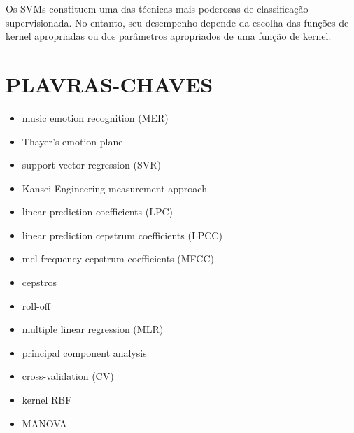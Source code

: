 \documentclass{article}
\begin{document}
Os SVMs constituem uma das técnicas mais poderosas de classificação supervisionada. No entanto, seu desempenho depende da escolha das funções de kernel apropriadas ou dos parâmetros apropriados de uma função de kernel.





\section{PLAVRAS-CHAVES}
\begin{itemize}
    \item music emotion recognition (MER)
    \item Thayer’s emotion plane
    \item support vector regression (SVR)
    \item Kansei Engineering measurement approach
    \item linear prediction coefficients (LPC)
    \item linear prediction cepstrum coefficients (LPCC)
    \item mel-frequency cepstrum coefficients (MFCC)
    \item cepstros
    \item roll-off
    \item multiple linear regression (MLR)
    \item principal component analysis
    \item cross-validation (CV)
    \item kernel RBF
    \item MANOVA
\end{itemize}
\end{document}
